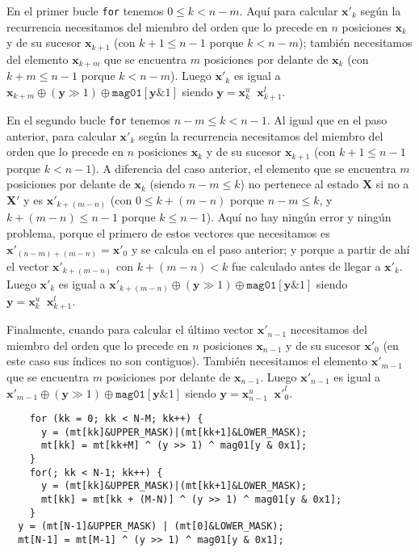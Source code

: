 \documentclass{article}
\DeclareMathOperator{\concat}{||}
\DeclareMathOperator{\bitand}{\&}
\begin{document}
En el primer bucle \verb#for# tenemos $0 \leq k < n - m$.
Aquí para calcular $\mathbf{x'}_k$ según la recurrencia necesitamos del miembro del orden que lo precede en $n$ posiciones $\mathbf{x}_k$ y de su sucesor $\mathbf{x}_{k + 1}$ (con $k + 1 \leq n - 1$ porque $k < n - m$);
también necesitamos del elemento $\mathbf{x}_{k + m}$ que se encuentra $m$ posiciones por delante de $\mathbf{x}_k$ (con $k + m \leq n - 1$ porque $k < n - m$).
Luego $\mathbf{x'}_k$ es igual a $\mathbf{x}_{k + m} \oplus (\mathbf{y} \gg 1) \oplus \texttt{mag01}[\mathbf{y} \bitand 1]$ siendo $\mathbf{y} = \mathbf{x}_k^u \concat \mathbf{x}_{k + 1}^l$.

En el segundo bucle \verb#for# tenemos $n - m \leq k < n - 1$.
Al igual que en el paso anterior, para calcular $\mathbf{x'}_k$ según la recurrencia necesitamos del miembro del orden que lo precede en $n$ posiciones $\mathbf{x}_k$ y de su sucesor $\mathbf{x}_{k + 1}$ (con $k + 1 \leq n - 1$ porque $k < n - 1$).
A diferencia del caso anterior, el elemento que se encuentra $m$ posiciones por delante de $\mathbf{x}_k$ (siendo $n - m \leq k$) no pertenece al estado $\mathbf{X}$ si no a $\mathbf{X'}$ y es $\mathbf{x'}_{k + (m - n)}$ (con $0 \leq k + (m - n)$ porque $n - m \leq k$, y $k + (m - n) \leq n - 1$ porque $k \leq n - 1$).
Aquí no hay ningún error y ningún problema, porque el primero de estos vectores que necesitamos es $\mathbf{x'}_{(n - m) + (m - n)} = \mathbf{x'}_0$ y se calcula en el paso anterior; y porque a partir de ahí el vector $\mathbf{x'}_{k + (m - n)}$ con $k + (m - n) < k$ fue calculado antes de llegar a $\mathbf{x'}_k$. 
Luego $\mathbf{x'}_k$ es igual a $\mathbf{x'}_{k + (m - n)} \oplus (\mathbf{y} \gg 1) \oplus \texttt{mag01}[\mathbf{y} \bitand 1]$ siendo $\mathbf{y} = \mathbf{x}_k^u \concat \mathbf{x}_{k + 1}^l$.

Finalmente, cuando para calcular el último vector $\mathbf{x'}_{n - 1}$ necesitamos del miembro del orden que lo precede en $n$ posiciones $\mathbf{x}_{n - 1}$ y de su sucesor $\mathbf{x'}_0$ (en este caso sus índices no son contiguos).
También necesitamos el elemento $\mathbf{x'}_{m - 1}$ que se encuentra $m$ posiciones por delante de $\mathbf{x}_{n - 1}$.
Luego $\mathbf{x'}_{n - 1}$ es igual a $\mathbf{x'}_{m - 1} \oplus (\mathbf{y} \gg 1) \oplus \texttt{mag01}[\mathbf{y} \bitand 1]$ siendo $\mathbf{y} = \mathbf{x}_{n - 1}^u \concat \mathbf{x'}_0^l$.

\begin{verbatim}
    for (kk = 0; kk < N-M; kk++) {
      y = (mt[kk]&UPPER_MASK)|(mt[kk+1]&LOWER_MASK);
      mt[kk] = mt[kk+M] ^ (y >> 1) ^ mag01[y & 0x1];
    }
    for(; kk < N-1; kk++) {
      y = (mt[kk]&UPPER_MASK)|(mt[kk+1]&LOWER_MASK);
      mt[kk] = mt[kk + (M-N)] ^ (y >> 1) ^ mag01[y & 0x1];
    }
  y = (mt[N-1]&UPPER_MASK) | (mt[0]&LOWER_MASK);
  mt[N-1] = mt[M-1] ^ (y >> 1) ^ mag01[y & 0x1];
\end{verbatim}
\end{document}

